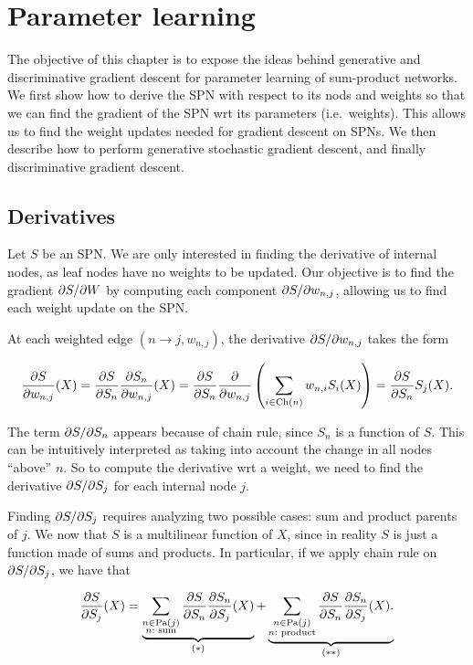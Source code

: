 \chapter{Parameter learning}\label{chp:weights}

The objective of this chapter is to expose the ideas behind generative and discriminative gradient
descent for parameter learning of sum-product networks. We first show how to derive the SPN with
respect to its nods and weights so that we can find the gradient of the SPN wrt its parameters
(i.e.\ weights). This allows us to find the weight updates needed for gradient descent on SPNs. We
then describe how to perform generative stochastic gradient descent, and finally discriminative
gradient descent.

\section{Derivatives}

Let $S$ be an SPN\@. We are only interested in finding the derivative of internal nodes, as leaf
nodes have no weights to be updated. Our objective is to find the gradient $\partial S/\partial W$ by
computing each component $\partial S/\partial w_{n,j}$, allowing us to find each weight update on the
SPN\@.

At each weighted edge $(n\to j, w_{n,j})$, the derivative $\partial S/\partial w_{n,j}$ takes the form

\begin{equation}
  \frac{\partial S}{\partial w_{n,j}}(X)=\frac{\partial S}{\partial S_n}\frac{\partial S_n}{\partial w_{n,j}}(X)=
    \frac{\partial S}{\partial S_n}\frac{\partial}{\partial w_{n,j}}\left(\sum_{i\in\operatorname*{\text{Ch}}(n)}w_{n,i}S_i(X)\right)=
    \frac{\partial S}{\partial S_n}S_j(X).
\end{equation}

The term $\partial S/\partial S_n$ appears because of chain rule, since $S_n$ is a function of $S$. This
can be intuitively interpreted as taking into account the change in all nodes ``above'' $n$. So to
compute the derivative wrt a weight, we need to find the derivative $\partial S/\partial S_j$ for each
internal node $j$.

Finding $\partial S/\partial S_j$ requires analyzing two possible cases: sum and product parents of $j$.
We now that $S$ is a multilinear function of $X$, since in reality $S$ is just a function made of
sums and products. In particular, if we apply chain rule on $\partial S/\partial S_j$, we have that

\begin{equation*}
  \frac{\partial S}{\partial S_j}(X)=\underbrace{\sum_{\substack{n\in\operatorname*{\text{Pa}}(j)\\n:\text{
          sum}}}\frac{\partial S}{\partial S_n}\frac{\partial S_n}{\partial S_j}(X)}_{(\ast)}+
    \underbrace{\sum_{\substack{n\in\operatorname*{\text{Pa}}(j)\\n:\text{
            product}}}\frac{\partial S}{\partial S_n}\frac{\partial S_n}{\partial S_j}(X).}_{(\ast\ast)}
\end{equation*}

